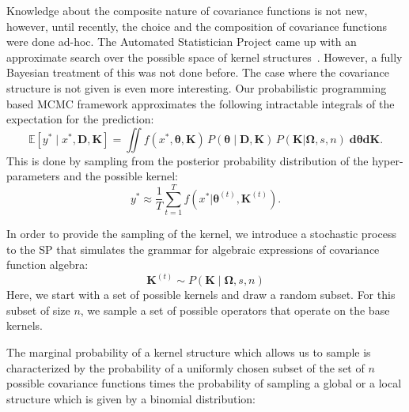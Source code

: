 \documentclass{article} %
\begin{document}
Knowledge about the composite nature of covariance functions is not new, however, until recently, the choice and the composition of covariance functions were done ad-hoc. The Automated Statistician Project came up with an approximate search over the possible space of kernel structures~\citep{duvenaud2013structure,lloyd2014automatic}. However, a fully Bayesian treatment of this was not done before.
The case where the covariance structure is not given is even more interesting. Our probabilistic programming based MCMC framework approximates the following intractable integrals of the expectation for the prediction:
\begin{equation}
\mathbb{E}[y^* \mid x^*,\mathbf{D},\mathbf{K}] =\iint f(x^*,\bm{\theta},\mathbf{K})\,P(\bm{\theta} \mid \mathbf{D,\mathbf{K}})\,P(\mathbf{K}|\bm{\Omega},s,n) \; \mathbf{d} \bm{\theta} \mathbf{d} \mathbf{K}.  
\end{equation}
This is done by sampling from the posterior probability distribution of the hyper-parameters and the possible kernel:
\begin{equation}
y^* \approx \frac{1}{T} \sum^T_{t=1} f(x^* | \bm{\theta}^{(t)},\mathbf{K}^{(t)}). 
\end{equation}


In order to provide the sampling of the kernel, we introduce a stochastic process to the SP that simulates the grammar for algebraic expressions of covariance function algebra:
\begin{equation}
\mathbf{K}^{(t)} \sim  P(\mathbf{K} \mid \bm{\Omega},s,n)
\end{equation}
Here, we start with a set of possible kernels and draw a random subset. For this subset of size $n$, we sample a set of possible operators that operate on the base kernels. 

The marginal probability of a kernel structure which allows us to sample  is characterized by the probability of a uniformly chosen subset of the set of $n$ possible covariance functions times the probability of sampling a global or a local structure which is given by a binomial distribution: 
\end{document}
